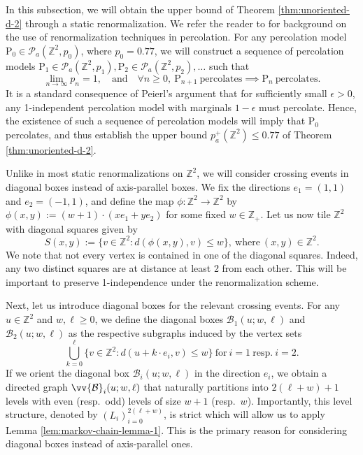 \documentclass[11pt]{article}
\renewcommand{\P}{\mathrm{P}}
\newcommand{\Z}{\mathbb{Z}}
\theoremstyle{remark}
\begin{document}
In this subsection, we will obtain the upper bound of Theorem \ref{thm:unoriented-d-2} through a static renormalization. We refer the reader to \cite[Section 7.4]{grimmett1999percolation} for background on the use of renormalization techniques in percolation.
For any percolation model $\P_0 \in \mathcal{P}_a(\mathbb{Z}^2, p_0)$, where $p_0= 0.77$, we will construct a sequence of percolation models $\P_1 \in \mathcal{P}_a(\mathbb{Z}^2, p_1), \P_2 \in \mathcal{P}_a(\mathbb{Z}^2, p_2),\ldots $ such that 
\begin{equation}
\lim_{n \to \infty} p_n = 1, \quad  \text{and} \quad \forall n\ge 0,\ \P_{n+1}\ \text{percolates} \implies \P_n\ \text{percolates}.
\end{equation}
It is a standard consequence of Peierl's argument that for sufficiently small $\epsilon>0$, any 1-independent percolation model with marginals $1-\epsilon$ must percolate. Hence, the existence of such a sequence of percolation models will imply that $\P_0$ percolates, and thus establish the upper bound $p_a^+(\Z^2) \le 0.77$ of Theorem \ref{thm:unoriented-d-2}.

Unlike in most static renormalizations on $\mathbb{Z}^2$, we will consider crossing events in diagonal boxes instead of axis-parallel boxes. We fix the directions $e_1 = (1,1)$ and $e_2=(-1,1)$, and define the map $\phi: \Z^2 \to \Z^2$ by $\phi(x,y) := (w+1)\cdot (x e_1 + y e_2)$ for some fixed $w \in \Z_+$.  Let us now tile $\Z^2$ with diagonal squares given by 
\begin{equation}
    S(x,y) := \{v \in \Z^2 : d(\phi(x,y),v) \le w\}, \ \text{where}\ (x,y) \in \Z^2.
\end{equation}
We note that not every vertex is contained in one of the diagonal squares. Indeed, any two distinct squares are at distance at least 2 from each other. This will be important to preserve 1-independence under the renormalization scheme.

Next, let us introduce diagonal boxes for the relevant crossing events. For any $u \in \mathbb{Z}^2$ and $w,\ell \ge 0$, we define the diagonal boxes $\mathcal{B}_1(u;w,\ell)$ and $\mathcal{B}_2(u;w,\ell)$  as the respective subgraphs induced by the vertex sets
\begin{equation} \label{eq:definition-diagonal-box}
    \bigcup_{k=0}^\ell \{v \in \Z^2 :  d(u+ k \cdot e_i,v) \le w\} \ \text{for}\ i=1\ \text{resp.}\ i=2.
\end{equation}
If we orient the diagonal box $\mathcal{B}_i(u;w,\ell)$ in the direction $e_i$, we obtain a directed graph $\vv{\mathcal{B}}_i(u;w,\ell)$ that naturally partitions into $2(\ell + w) + 1$ levels with even (resp.\ odd) levels of size $w +1$ (resp.\ $w$). Importantly, this level structure, denoted by $(L_i)_{i=0}^{2(\ell+w)}$, is strict which will allow us to apply Lemma \ref{lem:markov-chain-lemma-1}. This is the primary reason for considering diagonal boxes instead of axis-parallel ones.  
    
\end{document}
